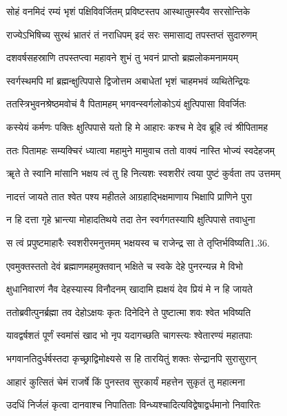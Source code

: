 \twolineshloka
{सोहं वनमिदं रम्यं भृशं पक्षिविवर्जितम्}
{प्रविष्टस्तप आस्थातुमस्यैव सरसोन्तिके}%

\twolineshloka
{राज्येऽभिषिच्य सुरथं भ्रातरं तं नराधिपम्}
{इदं सरः समासाद्य तपस्तप्तं सुदारुणम्}%

\twolineshloka
{दशवर्षसहस्राणि तपस्तप्त्वा महावने}
{शुभं तु भवनं प्राप्तो ब्रह्मलोकमनामयम्}%

\twolineshloka
{स्वर्गस्थमपि मां ब्रह्मन्क्षुत्पिपासे द्विजोत्तम}
{अबाधेतां भृशं चाहमभवं व्यथितेन्द्रियः}%

\twolineshloka
{ततस्त्रिभुवनश्रेष्ठमवोचं वै पितामहम्}
{भगवन्स्वर्गलोकोऽयं क्षुत्पिपासा विवर्जितः}%

\twolineshloka
{कस्येयं कर्मणः पक्तिः क्षुत्पिपासे यतो हि मे}
{आहारः कश्च मे देव ब्रूहि त्वं श्रीपितामह}%

\twolineshloka
{ततः पितामहः सम्यक्चिरं ध्यात्वा महामुने}
{मामुवाच ततो वाक्यं नास्ति भोज्यं स्वदेहजम्}%

\twolineshloka
{ॠते ते स्वानि मांसानि भक्षय त्वं तु हि नित्यशः}
{स्वशरीरं त्वया पुष्टं कुर्वता तप उत्तमम्}%

\twolineshloka
{नादत्तं जायते तात श्वेत पश्य महीतले}
{आग्रहाद्भिक्षमाणाय भिक्षापि प्राणिने पुरा}%

\twolineshloka
{न हि दत्ता गृहे भ्रान्त्या मोहादतिथये तदा}
{तेन स्वर्गगतस्यापि क्षुत्पिपासे तवाधुना}%

\twolineshloka
{स त्वं प्रपुष्टमाहारैः स्वशरीरमनुत्तमम्}
{भक्षयस्व च राजेन्द्र सा ते तृप्तिर्भविष्यति1.36.}%

\twolineshloka
{एवमुक्तस्ततो देवं ब्रह्माणमहमुक्तवान्}
{भक्षिते च स्वके देहे पुनरन्यन्न मे विभो}%

\twolineshloka
{क्षुधानिवारणं नैव देहस्यास्य विनौदनम्}
{खादामि ह्यक्षयं देव प्रियं मे न हि जायते}%

\twolineshloka
{ततोब्रवीत्पुनर्ब्रह्मा तव देहोऽक्षयः कृतः}
{दिनेदिने ते पुष्टात्मा शवः श्वेत भविष्यति}%

\twolineshloka
{यावद्वर्षशतं पूर्णं स्वमांसं खाद भो नृप}
{यदागच्छति चागस्त्यः श्वेतारण्यं महातपाः}%

\twolineshloka
{भगवानतिदुर्धर्षस्तदा कृच्छ्राद्विमोक्ष्यसे}
{स हि तारयितुं शक्तः सेन्द्रानपि सुरासुरान्}%

\twolineshloka
{आहारं कुत्सितं चेमं राजर्षे किं पुनस्तव}
{सुरकार्यं महत्तेन सुकृतं तु महात्मना}%

\twolineshloka
{उदधिं निर्जलं कृत्वा दानवाश्च निपातिताः}
{विन्ध्यश्चादित्यविद्वेषाद्वर्धमानो निवारितः}%

